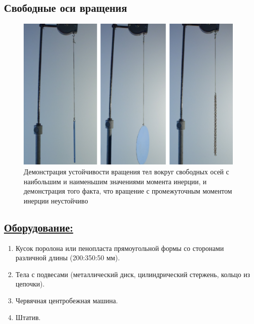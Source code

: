 \documentclass[14pt,a4paper,oneside]{extarticle}	%
\begin{document}

\begin{center}
	\subsection*{Свободные оси вращения}
\end{center}

\begin{figure}[H] 	%
	\centering 		%
	\includegraphics[width=0.8\linewidth]{freeaxis-1.png}
	\caption{Демонстрация устойчивости вращения тел вокруг свободных осей с наибольшим и наименьшим значениями момента инерции, и демонстрация того факта, что вращение с промежуточным моментом инерции неустойчиво}
	\label{freeaxis-1}
\end{figure}

\subsection*{\underline{Оборудование:}}

\begin{enumerate}
	\item Кусок поролона или пенопласта прямоугольной формы со сторонами различной длины (200:350:50 мм).
	\item Тела с подвесами (металлический диск, цилиндрический стержень, кольцо из цепочки).
	\item Червячная центробежная машина.
	\item Штатив.
\end{enumerate}
\end{document}
